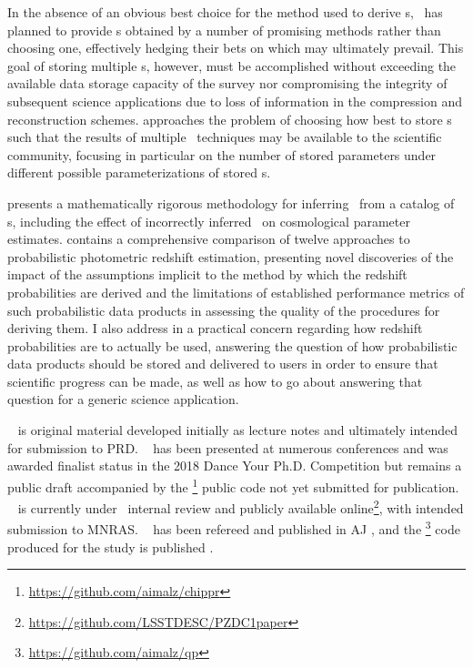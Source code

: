 In the absence of an obvious best choice for the method used to derive \pzpdf s, \lsst\ has planned to provide \pzpdf s obtained by a number of promising methods rather than choosing one, effectively hedging their bets on which may ultimately prevail.
This goal of storing multiple \pzpdf s, however, must be accomplished without exceeding the available data storage capacity of the survey nor compromising the integrity of subsequent science applications due to loss of information in the compression and reconstruction schemes.
 approaches the problem of choosing how best to store \pzpdf s such that the results of multiple \pzpdf\ techniques may be available to the scientific community, focusing in particular on the number of stored parameters under different possible parameterizations of stored \pzpdf s.

 presents a mathematically rigorous methodology for inferring \Nz\ from a catalog of \pzpdf s, including the effect of incorrectly inferred \Nz\ on cosmological parameter estimates.
 contains a comprehensive comparison of twelve approaches to probabilistic photometric redshift estimation, presenting novel discoveries of the impact of the assumptions implicit to the method by which the redshift probabilities are derived and the limitations of established performance metrics of such probabilistic data products in assessing the quality of the procedures for deriving them.
I also address in  a practical concern regarding how redshift probabilities are to actually be used, answering the question of how probabilistic data products should be stored and delivered to users in order to ensure that scientific progress can be made, as well as how to go about answering that question for a generic science application.

\chapname~ is original material developed initially as lecture notes and ultimately intended for submission to PRD.
\chapname~ has been presented at numerous conferences and was awarded finalist status in the 2018 Dance Your Ph.D. Competition but remains a public draft \citep{malz_cosmological_2018} accompanied by the \chippr\footnote{\url{https://github.com/aimalz/chippr}} public code not yet submitted for publication.
\chapname~ is currently under \desc\ internal review and publicly available online\footnote{\url{https://github.com/LSSTDESC/PZDC1paper}}, with intended submission to MNRAS.
\chapname~ has been refereed and published in AJ \citep{malz_approximating_2018}, and the \qp\footnote{\url{https://github.com/aimalz/qp}} code produced for the study is published \citep{malz_qp_2017}.

